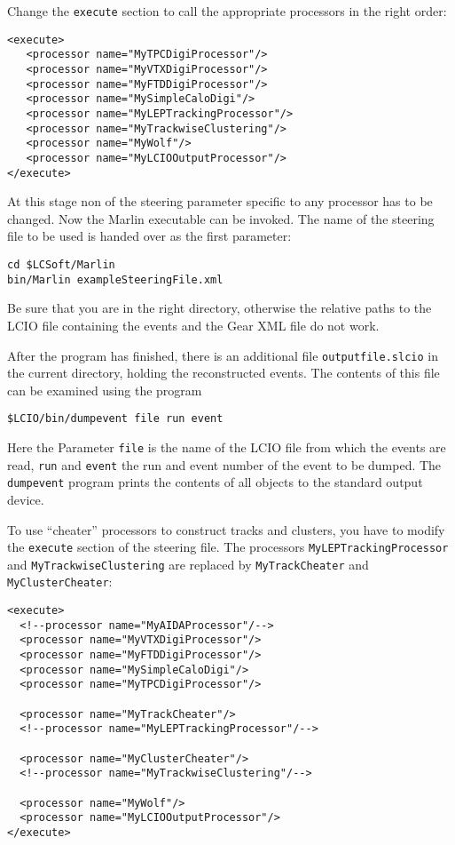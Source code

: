 Change the {\tt execute} section to call the appropriate processors in the
right order:

\begin{verbatim}
<execute>
   <processor name="MyTPCDigiProcessor"/>
   <processor name="MyVTXDigiProcessor"/>
   <processor name="MyFTDDigiProcessor"/>
   <processor name="MySimpleCaloDigi"/>
   <processor name="MyLEPTrackingProcessor"/>
   <processor name="MyTrackwiseClustering"/>
   <processor name="MyWolf"/>
   <processor name="MyLCIOOutputProcessor"/>
</execute>
\end{verbatim}

At this stage non of the steering parameter specific to any
processor has to be changed. Now the Marlin executable can be invoked.
The name of the steering file to be used is handed over as the first
parameter:

\begin{verbatim}
cd $LCSoft/Marlin
bin/Marlin exampleSteeringFile.xml
\end{verbatim}

Be sure that you are in the right directory, otherwise the relative
paths to the LCIO file containing the events and the Gear XML file do
not work.

After the program has finished, there is an additional file
{\tt outputfile.slcio} in the current directory, holding the reconstructed
events. The contents of this file can be examined using the program

\begin{verbatim}
$LCIO/bin/dumpevent file run event
\end{verbatim}

Here the Parameter {\tt file} is the name of the LCIO file from which the
events are read,
{\tt run} and {\tt event} the run and event number of the event to be dumped.
The {\tt dumpevent} program prints the contents of all objects to
the standard output device.

To use ``cheater'' processors to construct tracks and clusters,
you have to modify the {\tt execute} section of the steering file.
The processors {\tt MyLEPTrackingProcessor} and {\tt MyTrackwiseClustering}
are replaced by {\tt MyTrackCheater} and {\tt MyClusterCheater}:

\begin{verbatim}
<execute>
  <!--processor name="MyAIDAProcessor"/-->
  <processor name="MyVTXDigiProcessor"/>
  <processor name="MyFTDDigiProcessor"/>
  <processor name="MySimpleCaloDigi"/>
  <processor name="MyTPCDigiProcessor"/>

  <processor name="MyTrackCheater"/>
  <!--processor name="MyLEPTrackingProcessor"/-->

  <processor name="MyClusterCheater"/>
  <!--processor name="MyTrackwiseClustering"/-->

  <processor name="MyWolf"/>
  <processor name="MyLCIOOutputProcessor"/>
</execute>
\end{verbatim}


